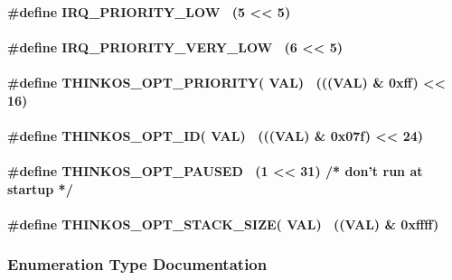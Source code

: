 {\hypertarget{h.2nusc19}{\paragraph{\texorpdfstring{{\#define
IRQ\_PRIORITY\_LOW~ (5 \textless{}\textless{}
5)}}{\#define IRQ\_PRIORITY\_LOW~ (5 \textless{}\textless{} 5)}}\label{h.2nusc19}}

\hypertarget{h.1302m92}{\paragraph{\texorpdfstring{{\#define
IRQ\_PRIORITY\_VERY\_LOW~ (6 \textless{}\textless{}
5)}}{\#define IRQ\_PRIORITY\_VERY\_LOW~ (6 \textless{}\textless{} 5)}}\label{h.1302m92}}

\hypertarget{h.3mzq4wv}{\paragraph{\texorpdfstring{{\#define
THINKOS\_OPT\_PRIORITY( VAL)~ (((VAL) \& 0xff) \textless{}\textless{}
16)}}{\#define THINKOS\_OPT\_PRIORITY( VAL)~ (((VAL) \& 0xff) \textless{}\textless{} 16)}}\label{h.3mzq4wv}}

\hypertarget{h.2250f4o}{\paragraph{\texorpdfstring{{\#define
THINKOS\_OPT\_ID( VAL)~ (((VAL) \& 0x07f) \textless{}\textless{}
24)}}{\#define THINKOS\_OPT\_ID( VAL)~ (((VAL) \& 0x07f) \textless{}\textless{} 24)}}\label{h.2250f4o}}

\hypertarget{h.haapch}{\paragraph{\texorpdfstring{{\#define
THINKOS\_OPT\_PAUSED~ (1 \textless{}\textless{} 31) /* don't run at
startup
*/}}{\#define THINKOS\_OPT\_PAUSED~ (1 \textless{}\textless{} 31) /* don't run at startup */}}\label{h.haapch}}

\hypertarget{h.319y80a}{\paragraph{\texorpdfstring{{\#define
THINKOS\_OPT\_STACK\_SIZE( VAL)~ ((VAL) \&
0xffff)}}{\#define THINKOS\_OPT\_STACK\_SIZE( VAL)~ ((VAL) \& 0xffff)}}\label{h.319y80a}}

{}

\subsubsection{\texorpdfstring{{Enumeration Type
Documentation}}{Enumeration Type Documentation}}\label{enumeration-type-documentation}

}
